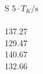 \begin{minipage}{0.49\textwidth}
 \centering
 \begin{tabular}{S }
 \toprule
${5} \cdot T_{K} / \si{\second}$ \\
 \\
 137.27 \\
 129.47 \\
 140.67 \\
 132.66 \\
 \bottomrule
 \end{tabular}
 \label{tab:T_gekoppelt_60}
  \end{minipage}
